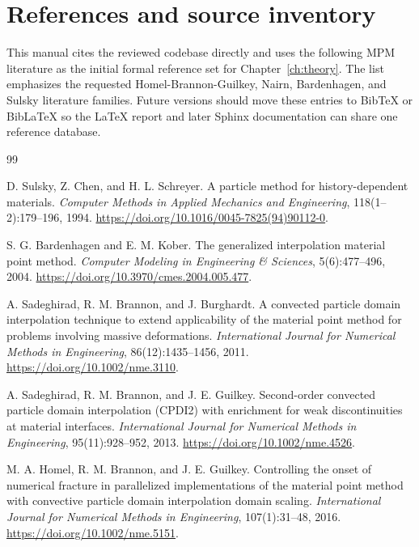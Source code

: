 \chapter{References and source inventory}
\label{ch:references}

This manual cites the reviewed codebase directly and uses the following MPM literature as the initial formal reference set for Chapter~\ref{ch:theory}.  The list emphasizes the requested Homel-Brannon-Guilkey, Nairn, Bardenhagen, and Sulsky literature families.  Future versions should move these entries to BibTeX or BibLaTeX so the LaTeX report and later Sphinx documentation can share one reference database.

\begin{thebibliography}{99}

D. Sulsky, Z. Chen, and H. L. Schreyer.
\newblock A particle method for history-dependent materials.
\newblock \emph{Computer Methods in Applied Mechanics and Engineering}, 118(1--2):179--196, 1994.
\newblock \url{https://doi.org/10.1016/0045-7825(94)90112-0}.

S. G. Bardenhagen and E. M. Kober.
\newblock The generalized interpolation material point method.
\newblock \emph{Computer Modeling in Engineering \& Sciences}, 5(6):477--496, 2004.
\newblock \url{https://doi.org/10.3970/cmes.2004.005.477}.

A. Sadeghirad, R. M. Brannon, and J. Burghardt.
\newblock A convected particle domain interpolation technique to extend applicability of the material point method for problems involving massive deformations.
\newblock \emph{International Journal for Numerical Methods in Engineering}, 86(12):1435--1456, 2011.
\newblock \url{https://doi.org/10.1002/nme.3110}.

A. Sadeghirad, R. M. Brannon, and J. E. Guilkey.
\newblock Second-order convected particle domain interpolation (CPDI2) with enrichment for weak discontinuities at material interfaces.
\newblock \emph{International Journal for Numerical Methods in Engineering}, 95(11):928--952, 2013.
\newblock \url{https://doi.org/10.1002/nme.4526}.

M. A. Homel, R. M. Brannon, and J. E. Guilkey.
\newblock Controlling the onset of numerical fracture in parallelized implementations of the material point method with convective particle domain interpolation domain scaling.
\newblock \emph{International Journal for Numerical Methods in Engineering}, 107(1):31--48, 2016.
\newblock \url{https://doi.org/10.1002/nme.5151}.




\end{thebibliography}
